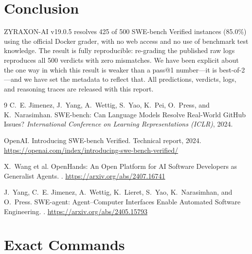 \documentclass[11pt,a4paper]{article}
\begin{document}
\section{Conclusion}

ZYRAXON-AI v19.0.5 resolves 425 of 500 SWE-bench Verified instances (85.0\%) using the
official Docker grader, with no web access and no use of benchmark test knowledge. The
result is fully reproducible: re-grading the published raw logs reproduces all 500
verdicts with zero mismatches. We have been explicit about the one way in which this
result is weaker than a pass@1 number---it is best-of-2---and we have set the metadata to
reflect that. All predictions, verdicts, logs, and reasoning traces are released with
this report.

\begin{thebibliography}{9}
C.~E. Jimenez, J.~Yang, A.~Wettig, S.~Yao, K.~Pei, O.~Press, and K.~Narasimhan.
\newblock SWE-bench: Can Language Models Resolve Real-World GitHub Issues?
\newblock \emph{International Conference on Learning Representations (ICLR)}, 2024.

OpenAI.
\newblock Introducing SWE-bench Verified.
\newblock Technical report, 2024.
\newblock \url{https://openai.com/index/introducing-swe-bench-verified/}

X.~Wang et al.
\newblock OpenHands: An Open Platform for AI Software Developers as Generalist Agents.
. \url{https://arxiv.org/abs/2407.16741}

J.~Yang, C.~E. Jimenez, A.~Wettig, K.~Lieret, S.~Yao, K.~Narasimhan, and O.~Press.
\newblock SWE-agent: Agent--Computer Interfaces Enable Automated Software Engineering.
. \url{https://arxiv.org/abs/2405.15793}
\end{thebibliography}

\appendix
\section{Exact Commands}
\label{sec:commands}
\end{document}
